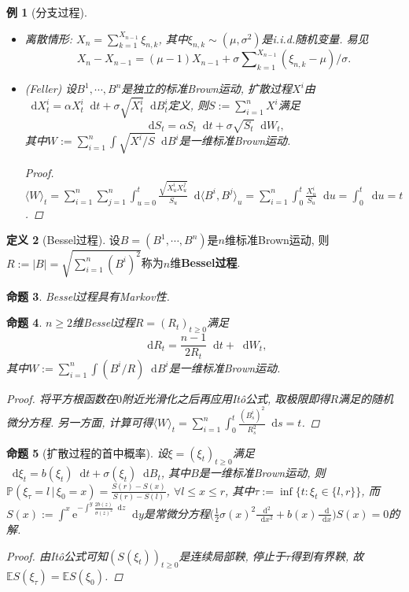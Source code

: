 \documentclass{ctexart}
\theoremstyle{definition}
\newtheorem{Def}{定义}[section]
\theoremstyle{remark}
\theoremstyle{plain}
\newtheorem{Prop}[Def]{命题}
\newtheorem{Eg}[Def]{例}
\newcommand{\1}{\mathbbm{1}}				%
\renewcommand{\P}{\mathbb{P}}				%
\newcommand{\E}{\mathbb{E}}					%
\newcommand{\agp}[1]{\langle #1 \rangle}	%
\newcommand{\abs}[1]{\lvert#1\rvert}			%
\newcommand{\tsum}{\textstyle\sum\nolimits}
\renewcommand*{\d}{\mathop{}\!\mathrm{d}}	%
\newcommand{\e}{\mathrm{e}}
\begin{document}
\begin{Eg}[分支过程]
\begin{itemize}
	\item 离散情形:
$X_{n} = \sum_{k=1}^{X_{n-1}} \xi_{n,k}$, 其中$\xi_{n,k} \sim (\mu,\sigma^{2})$是i.i.d.随机变量. 易见
\[ X_{n}-X_{n-1} = (\mu-1) X_{n-1} + \sigma \tsum_{k=1}^{X_{n-1}} (\xi_{n,k}-\mu)/\sigma . \]
	\item (Feller)
设$B^{1},\cdots,B^{n}$是独立的标准Brown运动, 扩散过程$X^i$由$\d X^{i}_{t} = \alpha X^{i}_{t} \d t + \sigma \sqrt{X^{i}_{t}} \d B^{i}_{t}$定义, 则$S := \sum_{i=1}^{n} X^{i}$满足
\[ \d S_{t} = \alpha S_{t} \d t + \sigma \sqrt{S_{t}} \d W_{t} , \]
其中$W := \sum_{i=1}^{n} \int \sqrt{X^{i}/S} \d B^{i}$是一维标准Brown运动.
\begin{proof}
$\agp{W}_{t} = \sum_{i=1}^{n}\sum_{j=1}^{n} \int_{u=0}^{t} \frac{\sqrt{X^{i}_{u}X^{j}_{u}}}{S_{u}} \d\agp{B^{i},B^{j}}_{u} = \sum_{i=1}^{n} \int_{0}^{t} \frac{X^{i}_{u}}{S_{u}} \d u = \int_{0}^{t} \d u = t$.
\end{proof}
\end{itemize}
\end{Eg}

\begin{Def}[Bessel过程]
设$B = (B^{1},\cdots,B^{n})$是$n$维标准Brown运动, 则$R := \abs{B} = \sqrt{\sum_{i=1}^{n}(B^{i})^{2}}$称为$n$维\textbf{Bessel过程}.
\end{Def}
\begin{Prop}
Bessel过程具有Markov性.
\end{Prop}

\begin{Prop}
$n \ge 2$维Bessel过程$R = (R_{t})_{t \ge 0}$满足
\[ \d R_{t} = \frac{n-1}{2R_{t}} \d t + \d W_{t} , \]
其中$W := \sum_{i=1}^{n} \int (B^{i}/R) \d B^{i}$是一维标准Brown运动.
\begin{proof}
将平方根函数在$0$附近光滑化之后再应用It\^{o}公式, 取极限即得$R$满足的随机微分方程. 另一方面, 计算可得$\agp{W}_{t} = \sum_{i=1}^{n} \int_{0}^{t} \frac{(B_{s}^{i})^{2}}{R_{s}^{2}} \d s = t$.
\end{proof}
\end{Prop}

\begin{Prop}[扩散过程的首中概率]\label{Prop:diffusion_hitting_probability}
设$\xi = (\xi_{t})_{t \ge 0}$满足$\d\xi_{t} = b(\xi_{t}) \d t + \sigma(\xi_{t}) \d B_{t}$, 其中$B$是一维标准Brown运动, 则$\P( \xi_{\tau} = l \,|\, \xi_{0} = x ) = \frac{S(r)-S(x)}{S(r)-S(l)}$, $\forall l \le x \le r$, 其中$\tau := \inf\{ t : \xi_{t} \in \{l,r\} \}$, 而$S(x) := \int^{x} \e^{- \int^{y} \frac{2b(z)}{\sigma(z)^{2}} \d z} \d y$是常微分方程$\big( \frac{1}{2}\sigma(x)^{2} \frac{\d^2}{\d x^2} + b(x) \frac{\d}{\d x} \big) S(x) = 0$的解.
\begin{proof}
由It\^{o}公式可知$(S(\xi_{t}))_{t \ge 0}$是连续局部鞅, 停止于$\tau$得到有界鞅, 故$\E S(\xi_{\tau}) = \E S(\xi_{0})$.
\end{proof}
\end{Prop}
\end{document}
